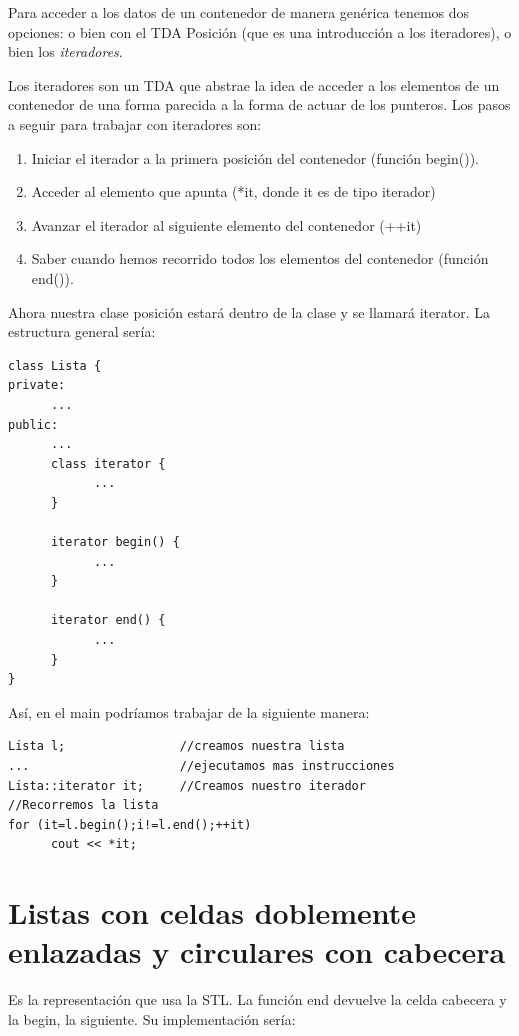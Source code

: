 \documentclass[10pt,a4paper,spanish]{report}
\begin{document}
\noindent
Para acceder a los datos de un contenedor de manera genérica tenemos dos opciones: o bien con el TDA Posición (que es una introducción a los iteradores), o bien los \textit{\textcolor[rgb]{0.2,0.5,0.5}{iteradores}}.

\noindent
Los iteradores son un TDA que abstrae la idea de acceder a los elementos de un contenedor de una forma parecida a la forma de actuar de los punteros. Los pasos a seguir para trabajar con iteradores son:
\begin{enumerate}[1.]
\item Iniciar el iterador a la primera posición del contenedor (función begin()).
\item Acceder al elemento que apunta (*it, donde it es de tipo iterador)
\item Avanzar el iterador al siguiente elemento del contenedor (++it)
\item Saber cuando hemos recorrido todos los elementos del contenedor (función end()).
\end{enumerate}

\noindent
Ahora nuestra clase posición estará dentro de la clase y se llamará iterator. La estructura general sería:

\begin{verbatim}
class Lista {
private:
      ...
public:
      ...
      class iterator {
            ...
      }

      iterator begin() {
            ...
      }

      iterator end() {
            ...
      }
}
\end{verbatim}

\noindent
Así, en el main podríamos trabajar de la siguiente manera:

\begin{verbatim}
Lista l;                //creamos nuestra lista
...                     //ejecutamos mas instrucciones
Lista::iterator it;     //Creamos nuestro iterador
//Recorremos la lista
for (it=l.begin();i!=l.end();++it)
      cout << *it;
\end{verbatim}

\section{\textcolor[rgb]{0.2,0.5,0.5}Listas con celdas doblemente enlazadas y circulares con cabecera}
\noindent
Es la representación que usa la STL. La función end devuelve la celda cabecera y la begin, la siguiente. Su implementación sería:
\end{document}
